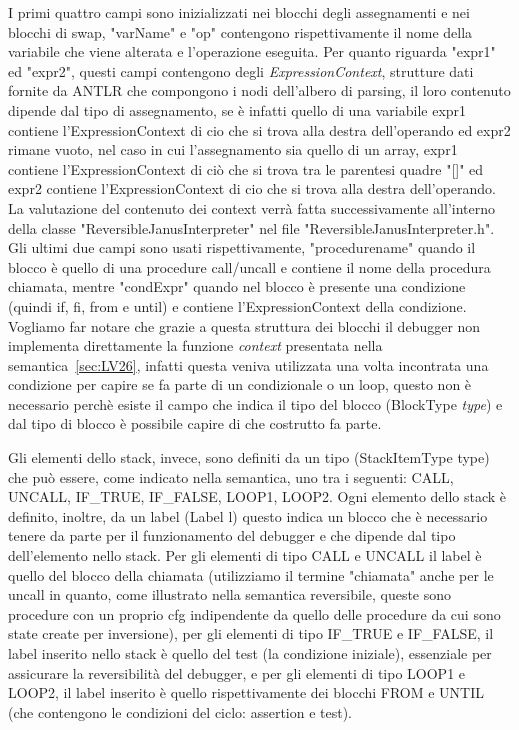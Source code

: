 \documentclass{article}
\theoremstyle{plain}
\theoremstyle{definition}
\theoremstyle{plain}
\begin{document}
I primi quattro campi sono inizializzati nei blocchi degli assegnamenti e nei blocchi di swap, "varName" e "op" contengono rispettivamente il nome della variabile che viene alterata e l'operazione eseguita. Per quanto riguarda "expr1" ed "expr2", questi campi contengono degli \emph{ExpressionContext}, strutture dati fornite da ANTLR che compongono i nodi dell'albero di parsing, il loro contenuto dipende dal tipo di assegnamento, se è infatti quello di una variabile expr1 contiene l'ExpressionContext di cio che si trova alla destra dell'operando ed expr2 rimane vuoto, nel caso in cui l'assegnamento sia quello di un array, expr1 contiene l'ExpressionContext di ciò che si trova tra le parentesi quadre "[]" ed expr2 contiene l'ExpressionContext di cio che si trova alla destra dell'operando. La valutazione del contenuto dei context verrà fatta successivamente all'interno della classe "ReversibleJanusInterpreter" nel file "ReversibleJanusInterpreter.h". Gli ultimi due campi sono usati rispettivamente, "procedurename" quando il blocco è quello di una procedure call/uncall e contiene il nome della procedura chiamata, mentre "condExpr" quando nel blocco è presente una condizione (quindi if, fi, from e until) e contiene l'ExpressionContext della condizione. Vogliamo far notare che grazie a questa struttura dei blocchi il debugger non implementa direttamente la funzione \emph{context} presentata nella semantica~\ref{sec:LV26}, infatti questa veniva utilizzata una volta incontrata una condizione per capire se fa parte di un condizionale o un loop, questo non è necessario perchè esiste il campo che indica il tipo del blocco (BlockType \emph{type}) e dal tipo di blocco è possibile capire di che costrutto fa parte.
\bigskip

Gli elementi dello stack, invece, sono definiti da un tipo (StackItemType type) che può essere, come indicato nella semantica, uno tra i seguenti: CALL, UNCALL, IF\_TRUE, IF\_FALSE, LOOP1, LOOP2. Ogni elemento dello stack è definito, inoltre, da un label (Label l) questo indica un blocco che è necessario tenere da parte per il funzionamento del debugger e che dipende dal tipo dell'elemento nello stack. Per gli elementi di tipo CALL e UNCALL il label è quello del blocco della chiamata (utilizziamo il termine "chiamata" anche per le uncall in quanto, come illustrato nella semantica reversibile, queste sono procedure con un proprio cfg indipendente da quello delle procedure da cui sono state create per inversione), per gli elementi di tipo IF\_TRUE e IF\_FALSE, il label inserito nello stack è quello del test (la condizione iniziale), essenziale per assicurare la reversibilità del debugger,  e per gli elementi di tipo LOOP1 e LOOP2, il label inserito è quello rispettivamente dei blocchi FROM e UNTIL (che contengono le condizioni del ciclo: assertion e test).
\end{document}
